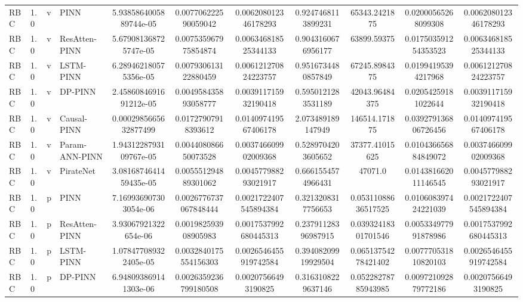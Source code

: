 \begin{landscape}
\begin{table}[p]
{\begin{tabular}{llllccccccc}
RBC &    1.0 &     v &           PINN & 5.9385864005889744e-05 &   0.007706222590059042 &   0.006208012346178293 &   0.9247468113899231 &         65343.2421875 &   0.02000565268099308 &   0.006208012346178293 \\
RBC &    1.0 &     v &  ResAtten-PINN &  5.679081368725747e-05 &   0.007535967975854874 &   0.006346818525344133 &   0.9043160676956177 &           63899.59375 &  0.017503591254353523 &   0.006346818525344133 \\
RBC &    1.0 &     v &      LSTM-PINN &  6.289462180575356e-05 &   0.007930613122880459 &   0.006121270824223757 &   0.9516734480857849 &         67245.8984375 &   0.01994195394217968 &   0.006121270824223757 \\
RBC &    1.0 &     v &        DP-PINN & 2.4586084691691212e-05 &   0.004958435893058777 &   0.003911715932190418 &   0.5950121283531189 &        42043.96484375 &   0.02054259181022644 &   0.003911715932190418 \\
RBC &    1.0 &     v &    Causal-PINN &  0.0002985665632877499 &    0.01727907918393612 &   0.014097419567406178 &    2.073489189147949 &         146514.171875 &  0.039279136806726456 &   0.014097419567406178 \\
RBC &    1.0 &     v & Param-ANN-PINN & 1.9431228793109767e-05 &   0.004408086650073528 &   0.003746609902009368 &   0.5289704203605652 &        37377.41015625 &  0.010436656884849072 &   0.003746609902009368 \\
RBC &    1.0 &     v &      PirateNet & 3.0816874641459435e-05 &   0.005551294889301062 &   0.004577988293021917 &   0.6661554574966431 &               47071.0 &  0.014381662011146545 &   0.004577988293021917 \\
RBC &    1.0 &     p &           PINN &  7.169936907303054e-06 &  0.0026776737067848444 &  0.0021722407545894384 &   0.3213208317756653 &   0.05311088636517525 &  0.010608397424221039 &  0.0021722407545894384 \\
RBC &    1.0 &     p &  ResAtten-PINN &   3.93067921322654e-06 &   0.001982593908905983 &  0.0017537992680445313 &  0.23791128396987915 &   0.03932418301701546 &  0.005334977991878986 &  0.0017537992680445313 \\
RBC &    1.0 &     p &      LSTM-PINN &  1.078477089322405e-05 &  0.0032840175554156303 &  0.0026546455919742584 &  0.39408209919929504 &   0.06513754278421402 &  0.007770531810820103 &  0.0026546455919742584 \\
RBC &    1.0 &     p &        DP-PINN &  6.948093869141303e-06 &  0.0026359236799180508 &    0.00207566493190825 &   0.3163108229637146 &   0.05228278785943985 &  0.009721092879772186 &    0.00207566493190825 \\

\end{tabular}}
\end{table}
\end{landscape}
